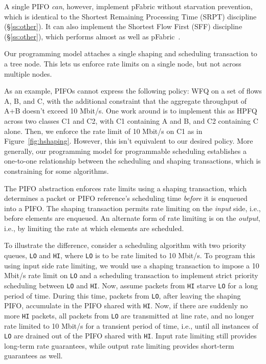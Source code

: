 A single PIFO {\em can}, however, implement pFabric without starvation prevention,
which is identical to the Shortest Remaining Processing Time (SRPT) discipline
(\S\ref{ss:other}).  It can also implement the Shortest Flow First (SFF)
discipline (\S\ref{ss:other}), which performs almost as well as
pFabric~\cite{pFabric}.

  Our
programming model attaches a single shaping and scheduling transaction
to a tree node. This lets us enforce rate limits on a single node, but not
across multiple nodes.

As an example, PIFOs
cannot express the following policy: WFQ on a set of flows A, B, and
C, with the additional constraint that the aggregate throughput of A+B
doesn't exceed 10 Mbit/s. One work around is to implement this as HPFQ
across two classes C1 and C2, with C1 containing A and B, and C2
containing C alone. Then, we enforce the rate limit of 10 Mbit/s on
C1 as in Figure~\ref{fig:hshaping}. However, this isn't equivalent to our desired policy. More
generally, our programming model for programmable scheduling
establishes a one-to-one relationship between the scheduling and
shaping transactions, which is constraining for some algorithms.

 The PIFO abstraction enforces rate
limits using a shaping transaction, which determines a packet or PIFO
reference's scheduling time {\em before} it is enqueued into a PIFO.
The shaping transaction permits rate limiting on the {\em input} side,
i.e., before elements are enqueued. An alternate form of rate limiting
is on the {\em output}, i.e., by limiting the rate at which elements
are scheduled.

To illustrate the difference, consider a scheduling algorithm with two
priority queues, \texttt{LO} and \texttt{HI}, where \texttt{LO} is to
be rate limited to 10 Mbit/s. To program this using input side rate
limiting, we would use a shaping transaction to impose a 10 Mbit/s
rate limit on \texttt{LO} and a scheduling transaction to implement
strict priority scheduling between \texttt{LO} and \texttt{HI}. Now,
assume packets from \texttt{HI} starve \texttt{LO} for a long
period of time. During this time, packets from \texttt{LO}, after
leaving the shaping PIFO, accumulate in the PIFO shared with
\texttt{HI}. Now, if there are suddenly no more \texttt{HI} packets,
all packets from \texttt{LO} are transmitted at line rate, and no
longer rate limited to 10 Mbit/s for a transient period of time,
i.e., until all instances of \texttt{LO} are drained out of the PIFO
shared with \texttt{HI}. Input rate limiting still provides long-term
rate guarantees, while output rate limiting provides short-term
guarantees as well.
